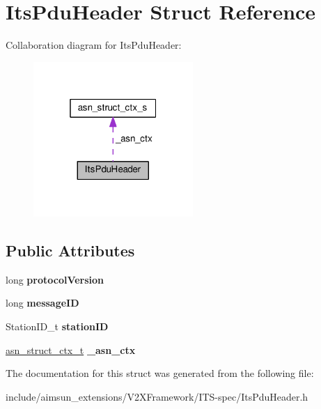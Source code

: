 \hypertarget{structItsPduHeader}{}\section{Its\+Pdu\+Header Struct Reference}
\label{structItsPduHeader}


Collaboration diagram for Its\+Pdu\+Header\+:\nopagebreak
\begin{figure}[H]
\begin{center}
\leavevmode
\includegraphics[width=172pt]{structItsPduHeader__coll__graph}
\end{center}
\end{figure}
\subsection*{Public Attributes}
\begin{DoxyCompactItemize}
\item 
long {\bfseries protocol\+Version}\hypertarget{structItsPduHeader_a34b7f684d58d4f907aebea616dddba03}{}\label{structItsPduHeader_a34b7f684d58d4f907aebea616dddba03}

\item 
long {\bfseries message\+ID}\hypertarget{structItsPduHeader_a1f634ad181191eadcd82b15e84ae6fc9}{}\label{structItsPduHeader_a1f634ad181191eadcd82b15e84ae6fc9}

\item 
Station\+I\+D\+\_\+t {\bfseries station\+ID}\hypertarget{structItsPduHeader_ac06c3b76a94d7b9c90ee58985c8a255c}{}\label{structItsPduHeader_ac06c3b76a94d7b9c90ee58985c8a255c}

\item 
\hyperlink{structasn__struct__ctx__s}{asn\+\_\+struct\+\_\+ctx\+\_\+t} {\bfseries \+\_\+asn\+\_\+ctx}\hypertarget{structItsPduHeader_a841ab115d1d04f3974521d00ecb28ee4}{}\label{structItsPduHeader_a841ab115d1d04f3974521d00ecb28ee4}

\end{DoxyCompactItemize}


The documentation for this struct was generated from the following file\+:\begin{DoxyCompactItemize}
\item 
include/aimsun\+\_\+extensions/\+V2\+X\+Framework/\+I\+T\+S-\/spec/Its\+Pdu\+Header.\+h\end{DoxyCompactItemize}
